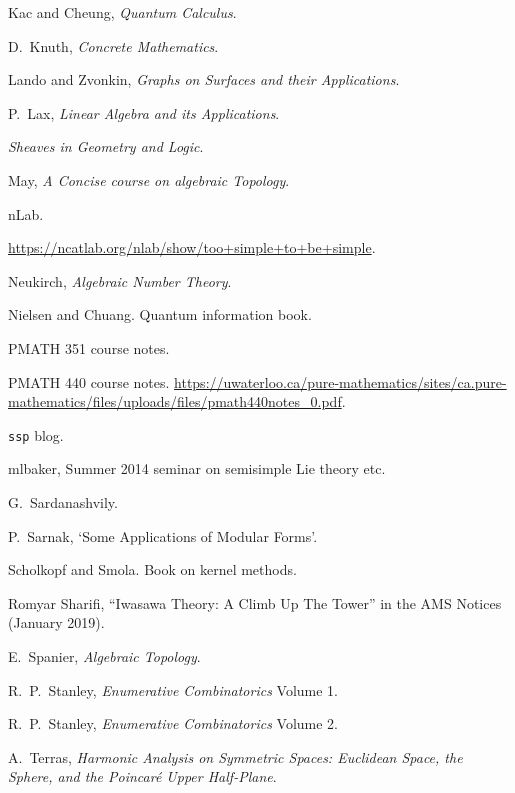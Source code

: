 \begin{thebibliography}{}
Kac and Cheung, \emph{Quantum Calculus}.

D.\ Knuth, \emph{Concrete Mathematics}.

Lando and Zvonkin, \emph{Graphs on Surfaces and their Applications}.

P.\ Lax, \emph{Linear Algebra and its Applications}.

\emph{Sheaves in Geometry and Logic}.

May, \emph{A Concise course on algebraic Topology}.

nLab.

\url{https://ncatlab.org/nlab/show/too+simple+to+be+simple}.

Neukirch, \emph{Algebraic Number Theory}.

Nielsen and Chuang. Quantum information book.

PMATH 351 course notes.

PMATH 440 course notes. \url{https://uwaterloo.ca/pure-mathematics/sites/ca.pure-mathematics/files/uploads/files/pmath440notes_0.pdf}.

\texttt{ssp} blog.

\textsf{mlbaker}, Summer 2014 seminar on semisimple Lie theory etc.

G.\ Sardanashvily.

P.\ Sarnak, `Some Applications of Modular Forms'.

Scholkopf and Smola. Book on kernel methods.

Romyar Sharifi, ``Iwasawa Theory: A Climb Up The Tower'' in the AMS Notices (January 2019).

E.\ Spanier, \emph{Algebraic Topology}.

R.\ P.\ Stanley, \emph{Enumerative Combinatorics} Volume 1.

R.\ P.\ Stanley, \emph{Enumerative Combinatorics} Volume 2.

A.\ Terras, \emph{Harmonic Analysis on Symmetric Spaces: Euclidean Space, the Sphere, and the Poincar\'e Upper Half-Plane}.


\end{thebibliography}
